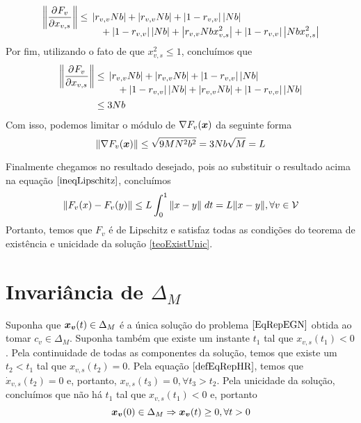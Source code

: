 \begin{equation}
    \left\|\pdv{F_v}{x_{v,s}}\right\| \leq \!\begin{multlined}[t]
        \left| r_{v,v} N b \right| +
        \left|r_{v,v} N b \right| +
        \left|1-r_{v,v}\right| \left| N b \right| \\ + 
        \left|1-r_{v,v}\right| \left| N b \right| +
        \left|r_{v,v} N b x_{v,s}^2 \right|
        +  \left|1-r_{v,v}\right| \left| N b x_{v,s}^2\right|
    \end{multlined}
\end{equation}
Por fim, utilizando o fato de que $x_{v,s}^2\leq 1$, concluímos que
\begin{equation}
\begin{split}
    \left\|\pdv{F_v}{x_{v,s}}\right\| &\leq \!\begin{multlined}[t]
        \left| r_{v,v} N b \right| +
        \left|r_{v,v} N b \right| +
        \left|1-r_{v,v}\right| \left| N b \right| \\+ 
        \left|1-r_{v,v}\right| \left| N b \right| +
        \left|r_{v,v} N b \right| +
        \left|1-r_{v,v}\right| \left| N b\right|
    \end{multlined}\\
    &\leq 3 N b
\end{split}
\end{equation}
Com isso, podemos limitar o módulo de $\nabla F_v(\boldsymbol{x})$ da seguinte forma
\begin{equation}
    \left\|\nabla F_v(\boldsymbol{x})\right\| \leq \sqrt{9MN^2b^2} = 3 N b \sqrt{M} = L
\end{equation}

Finalmente chegamos no resultado desejado, pois ao substituir o resultado acima na equação $\eqref{ineqLipschitz}$, concluímos
\begin{equation}
    \|F_v(x)-F_v(y)\|\leq L \int_0^1 \|x-y\| \; dt = L\|x-y\|,\forall v\in\mathcal{V}
\end{equation}
Portanto, temos que $F_v$ é de Lipschitz e satisfaz todas as condições do teorema de existência e unicidade da solução \ref{teoExistUnic}.


\section{Invariância de $\Delta_M$}

Suponha que $\boldsymbol{x_v}(t)\in\Delta_M$ é a única solução do problema $\eqref{EqRepEGN}$ obtida ao tomar $c_v\in\Delta_M$. Suponha também que existe um instante $t_1$ tal que $x_{v,s}(t_1)<0$. Pela continuidade de todas as componentes da solução, temos que existe um $t_2<t_1$ tal que $x_{v,s}(t_2)=0$. Pela equação $\eqref{defEqRepHR}$, temos que $\Dot{x}_{v,s}(t_2)=0$ e, portanto, $x_{v,s}(t_3)=0,\forall t_3>t_2$. Pela unicidade da solução, concluímos que não há $t_1$ tal que $x_{v,s}(t_1)<0$ e, portanto
\begin{equation}
\label{invariancia1}
    \boldsymbol{x_v}(0)\in\Delta_M \Rightarrow \boldsymbol{x_v}(t)\geq 0,\forall t>0
\end{equation}

